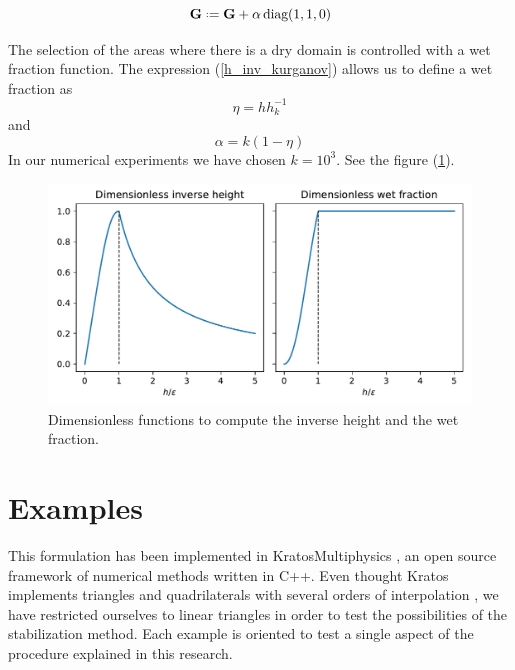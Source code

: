 \documentclass[a4paper,12pt]{article}
\newcommand{\defeq}{\mathrel{\vcenter{\baselineskip0.5ex\lineskiplimit0pt\hbox{\scriptsize.}\hbox{\scriptsize.}}}=}
\begin{document}
\begin{equation}
\mathbf{G} \defeq \mathbf{G} + \alpha\,\text{diag}(1, 1, 0)
\end{equation}

The selection of the areas where there is a dry domain is controlled with a wet fraction function. The expression (\ref{h_inv_kurganov}) allows us to define a wet fraction as
\begin{equation}
\eta = hh^{-1}_k
\end{equation}
and
\begin{equation}
\alpha = k(1-\eta)
\end{equation}
In our numerical experiments we have chosen $k=10^3$. See the figure (\ref{inverse_heihgt}).

\begin{figure}
    \centering
    \includegraphics[width=\textwidth]{img/fig/inverse_height.pdf}
    \caption{Dimensionless functions to compute the  inverse height and the wet fraction.}
    \label{inverse_heihgt}
\end{figure}


\section{Examples} \label{sec:examples}

This formulation has been implemented in KratosMultiphysics \cite{dadvand2010, dadvand2013}, an open source framework of numerical methods written in C++. Even thought Kratos implements triangles and quadrilaterals with several orders of interpolation \cite{kratos2020}, we have restricted ourselves to linear triangles in order to test the possibilities of the stabilization method. Each example is oriented to test a single aspect of the procedure explained in this research.
\end{document}
